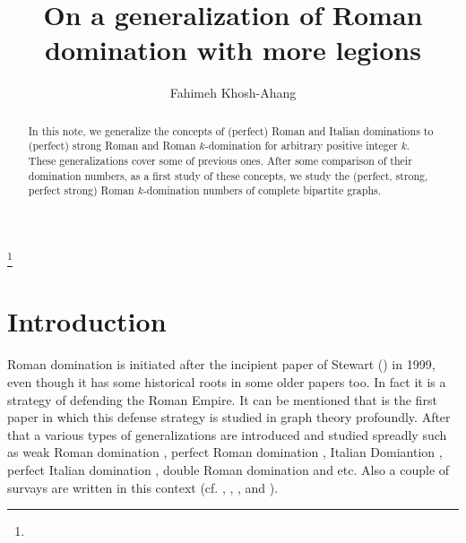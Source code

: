 \documentclass[12pt]{amsart}
\begin{document}
\title {On a generalization of Roman domination with more legions}

\author {Fahimeh Khosh-Ahang}




\address{Fahimeh Khosh-Ahang Ghasr, Department of Mathematics, School of Science, Ilam University,
P.O.Box 69315-516, Ilam, Iran}







\dedicatory{ }

\begin{abstract}
In this note, we generalize the concepts of (perfect) Roman and Italian dominations to (perfect) strong Roman and Roman $k$-domination for arbitrary positive integer $k$. These generalizations cover some of previous ones. After some comparison of their domination numbers, as a first study of these concepts, we study the (perfect, strong, perfect strong) Roman $k$-domination numbers of complete bipartite graphs.
\end{abstract}

\thanks{}




\maketitle

\setcounter{tocdepth}{1}

\section{Introduction}
Roman domination is initiated after the incipient paper of Stewart (\cite{Stewart}) in 1999, even though it has some historical roots in some older papers too. In fact it is a strategy of defending the Roman Empire. It can be mentioned that \cite{Cokayane} is the first paper in which this defense strategy is studied in graph theory profoundly. After that a various types of generalizations are introduced and studied spreadly such as weak Roman domination \cite{Henning+hedetniemi}, perfect Roman domination \cite{Klostermeyer2}, Italian Domiantion \cite{Chellali}, perfect Italian domination \cite{perfect}, double Roman domination \cite{double} and etc. Also a couple of survays are written in this context (cf. \cite{Klostermeyer1}, \cite{Klostermeyer2}, \cite{Chellali2}, \cite{Chellali3} and \cite{Chellali1}).
\end{document}
